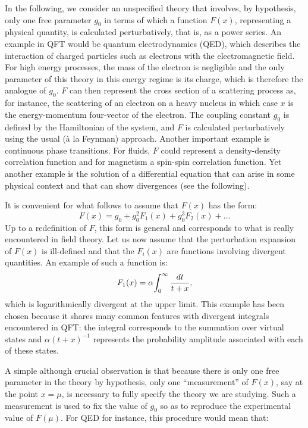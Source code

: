 \documentclass[floatfix,twocolumn,preprintnumbers,amsmath,amssymb,prb]{revtex4}
\begin{document}
In the following, we consider an unspecified theory that
involves, by hypothesis, only one free parameter $g_0$
in terms of which a function
$F(x)$, representing a physical quantity, is calculated
perturbatively, that is, as a power series. An example in QFT
would be quantum electrodynamics (QED), which describes the
interaction of charged particles such as electrons with the
electromagnetic field. For high energy processes, the mass of the
electron is negligible and the only parameter of this theory in
this energy regime is its charge, which is therefore the analogue
of $g_0$.
$F$ can then represent the cross section of a scattering process
as, for instance, the scattering of an electron on a heavy nucleus
in which case $x$ is the energy-momentum four-vector of the
electron. The coupling constant $g_0$ is defined by the
Hamiltonian of the system, and $F$ is calculated perturbatively
using the usual (\`a la Feynman) approach. Another important
example is continuous phase transitions. For fluids,
$F$ could represent a density-density correlation function and for
magnetism a spin-spin correlation function.\cite{foot3} Yet
another example is the solution of a differential equation that
can arise in some physical context and that can show divergences
(see the following).

It is convenient for what follows to assume that $F(x)$ has the
form:
\begin{equation}
F(x)= g_0 +g_0^2 F_1(x) + g_0^3 F_2(x) + \dots
\label{developpement}
\end{equation}
Up to a redefinition of $F$, this form is general and corresponds 
to what is really encountered in field
theory. Let us now assume that the perturbation expansion of $F(x)$ is
ill-defined and that the
$F_i(x)$ are functions involving divergent quantities. An example of such a function is:
\begin{equation}
F_1(x)= \alpha \! \int_0^\infty {dt\over t+x},
\label{exemple}
\end{equation}
which is logarithmically divergent at the upper limit. This example
has been chosen because it shares many common features with
divergent integrals encountered in QFT: the integral corresponds to
the summation over virtual states and $\alpha (t+x)^{-1}$
represents the probability amplitude associated with each of these
states.\cite{foot4}

A simple although crucial observation is that because there is only
one free parameter in the theory by
hypothesis, only one ``measurement'' of
$F(x)$, say at the point $x=\mu$, is necessary to fully specify the
theory we are studying. Such a measurement is used to fix the value of $g_0$ 
so as to reproduce the experimental value of $F(\mu)$. For QED for instance, 
this procedure would mean that:
\end{document}
